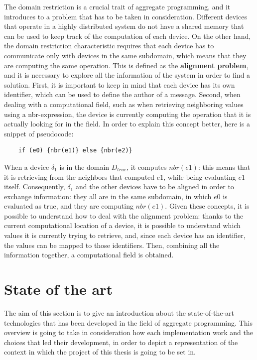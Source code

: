The domain restriction is a crucial trait of aggregate programming, and it introduces to a problem that has to be taken in consideration. Different devices that operate in a highly distributed system do not have a shared memory that can be used to keep track of the computation of each device. On the other hand, the domain restriction characteristic requires that each device has to communicate only with devices in the same subdomain, which means that they are computing the same operation.\newline
This is defined as the \textbf{alignment problem}, and it is necessary to explore all the information of the system in order to find a solution. First, it is important to keep in mind that each device has its own identifier, which can be used to define the author of a message. Second, when dealing with a computational field, such as when retrieving neighboring values using a nbr-expression, the device is currently computing the operation that it is actually looking for in the field.\newline
In order to explain this concept better, here is a snippet of pseudocode:
\begin{lstlisting}
    if (e0) {nbr(e1)} else {nbr(e2)}
\end{lstlisting}
When a device $\delta_1$ is in the domain $D_{true}$, it computes $nbr(e1)$: this means that it is retrieving from the neighbors that computed $e1$, while being evaluating $e1$ itself.\newline
Consequently, $\delta_1$ and the other devices have to be aligned in order to exchange information: they all are in the same subdomain, in which $e0$ is evaluated as true, and they are computing $nbr(e1)$.\newline
Given these concepts, it is possible to understand how to deal with the alignment problem: thanks to the current computational location of a device, it is possible to understand which values it is currently trying to retrieve, and, since each device has an identifier, the values can be mapped to those identifiers. Then, combining all the information together, a computational field is obtained.

\section{State of the art}
The aim of this section is to give an introduction about the state-of-the-art technologies that has been developed in the field of aggregate programming. This overview is going to take in consideration how each implementation work and the choices that led their development, in order to depict a representation of the context in which the project of this thesis is going to be set in.

